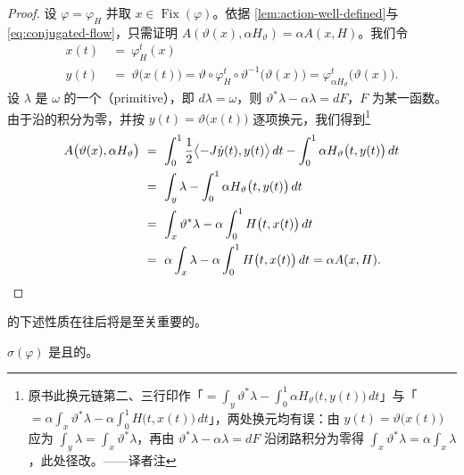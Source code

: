 \begin{proof}
设 $\varphi=\varphi_{H}$ 并取 $x\in\operatorname{Fix}(\varphi)$。依据%
\cref{lem:action-well-defined}与 \eqref{eq:conjugated-flow}，只需证明%
$A(\vartheta(x),\alpha H_{\vartheta})=\alpha A(x,H)$。我们令
\begin{align*}
x(t)\ &=\ \varphi_{H}^{t}(x)\\
y(t)\ &=\ \vartheta\bigl(x(t)\bigr)=\vartheta\circ\varphi_{H}^{t}\circ\vartheta^{-1}\bigl(\vartheta(x)\bigr)=\varphi_{\alpha H_{\vartheta}}^{t}\bigl(\vartheta(x)\bigr).
\end{align*}
设 $\lambda$ 是 $\omega$ 的一个\textbf{\trPrimitive}（primitive），即%
$d\lambda=\omega$，则 $\vartheta^{*}\lambda-\alpha\lambda=dF$，$F$ 为某一函数。%
由于\trClosedForm{}沿\trLoop{}的积分为零，并按 $y(t)=\vartheta\bigl(x(t)\bigr)$%
逐项换元，我们得到\footnote{原书此换元链第二、三行印作「$=\int_{y}\vartheta^{*}\lambda-\int_{0}^{1}\alpha H_{\vartheta}\bigl(t,y(t)\bigr)\,dt$」与「$=\alpha\int_{x}\vartheta^{*}\lambda-\alpha\int_{0}^{1}H\bigl(t,x(t)\bigr)\,dt$」，两处换元均有误：由 $y(t)=\vartheta\bigl(x(t)\bigr)$ 应为 $\int_{y}\lambda=\int_{x}\vartheta^{*}\lambda$，再由 $\vartheta^{*}\lambda-\alpha\lambda=dF$ 沿闭路积分为零得 $\int_{x}\vartheta^{*}\lambda=\alpha\int_{x}\lambda$，此处径改。——译者注}
\begin{align*}
A\bigl(\vartheta(x),\alpha H_{\vartheta}\bigr)\ &=\ \int_{0}^{1}\frac{1}{2}\bigl\langle-J\dot{y}(t),y(t)\bigr\rangle\,dt-\int_{0}^{1}\alpha H_{\vartheta}\bigl(t,y(t)\bigr)\,dt\\
&=\ \int_{y}\lambda-\int_{0}^{1}\alpha H_{\vartheta}\bigl(t,y(t)\bigr)\,dt\\
&=\ \int_{x}\vartheta^{*}\lambda-\alpha\int_{0}^{1}H\bigl(t,x(t)\bigr)\,dt\\
&=\ \alpha\int_{x}\lambda-\alpha\int_{0}^{1}H\bigl(t,x(t)\bigr)\,dt=\alpha A(x,H). \qedhere
\end{align*}
\end{proof}

\trActionSpectrum{}的下述性质在往后将是至关重要的。

\begin{proposition}\label{prop:spectrum-compact}
\trActionSpectrum{} $\sigma(\varphi)$ 是\trCompact{}且\trNowhereDense{}的。
\end{proposition}

